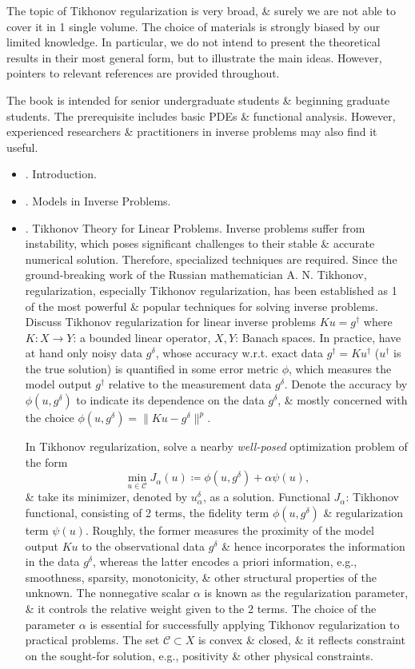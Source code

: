 \documentclass{article}
\begin{document}
\begin{itemize}
	The topic of Tikhonov regularization is very broad, \& surely we are not able to cover it in 1 single volume. The choice of materials is strongly biased by our limited knowledge. In particular, we do not intend to present the theoretical results in their most general form, but to illustrate the main ideas. However, pointers to relevant references are provided throughout.
	
	The book is intended for senior undergraduate students \& beginning graduate students. The prerequisite includes basic PDEs \& functional analysis. However, experienced researchers \& practitioners in inverse problems may also find it useful.
	\begin{itemize}
		\item {. Introduction.}
		\item {. Models in Inverse Problems.}
		\item {. Tikhonov Theory for Linear Problems.} Inverse problems suffer from instability, which poses significant challenges to their stable \& accurate numerical solution. Therefore, specialized techniques are required. Since the ground-breaking work of the Russian mathematician {\sc A. N. Tikhonov}, regularization, especially Tikhonov regularization, has been established as 1 of the most powerful \& popular techniques for solving inverse problems. Discuss Tikhonov regularization for linear inverse problems $Ku = g^\dagger$ where $K:X\to Y$: a bounded linear operator, $X,Y$: Banach spaces. In practice, have at hand only noisy data $g^\delta$, whose accuracy w.r.t. exact data $g^\dagger = Ku^\dagger$ ($u^\dagger$ is the true solution) is quantified in some error metric $\phi$, which measures the model output $g^\dagger$ relative to the measurement data $g^\delta$. Denote the accuracy by $\phi(u,g^\delta)$ to indicate its dependence on the data $g^\delta$, \& mostly concerned with the choice $\phi(u,g^\delta) = \|Ku - g^\delta\|^p$.
		
		In Tikhonov regularization, solve a nearby {\it well-posed} optimization problem of the form
		\begin{equation}
			\min_{u\in\mathcal{C}} J_\alpha(u)\coloneqq\phi(u,g^\delta) + \alpha\psi(u),
		\end{equation}
		\& take its minimizer, denoted by $u_\alpha^\delta$, as a solution. Functional $J_\alpha$: Tikhonov functional, consisting of 2 terms, the fidelity term $\phi(u,g^\delta)$ \& regularization term $\psi(u)$. Roughly, the former measures the proximity of the model output $Ku$ to the observational data $g^\delta$ \& hence incorporates the information in the data $g^\delta$, whereas the latter encodes a priori information, e.g., smoothness, sparsity, monotonicity, \& other structural properties of the unknown. The nonnegative scalar $\alpha$ is known as the regularization parameter, \& it controls the relative weight given to the 2 terms. The choice of the parameter $\alpha$ is essential for successfully applying Tikhonov regularization to practical problems. The set $\mathcal{C}\subset X$ is convex \& closed, \& it reflects constraint on the sought-for solution, e.g., positivity \& other physical constraints.
		

\end{itemize}
\end{itemize}
\end{document}
